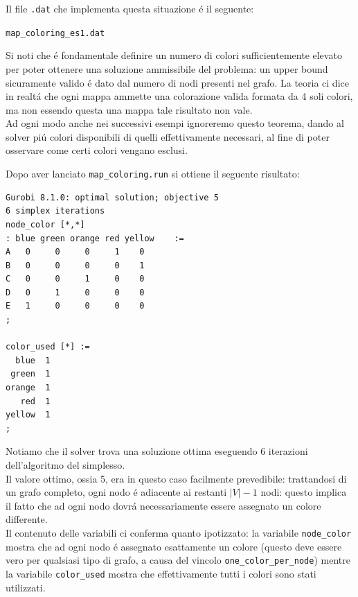 \documentclass{article}
\begin{document}
Il file \texttt{.dat} che implementa questa situazione \'e il seguente:

\vspace{5mm}
\texttt{map\_coloring\_es1.dat}

\vspace{5mm}

Si noti che \'e fondamentale definire un numero di colori sufficientemente elevato per poter ottenere una soluzione ammissibile del problema: un upper bound sicuramente valido \'e dato dal numero di nodi presenti nel grafo. La teoria ci dice in realt\'a che ogni mappa ammette una colorazione valida formata da 4 soli colori, ma non essendo questa una mappa tale risultato non vale.\\
Ad ogni modo anche nei successivi esempi ignoreremo questo teorema, dando al solver pi\'u colori disponibili di quelli effettivamente necessari, al fine di poter osservare come certi colori vengano esclusi.\\

\pagebreak

Dopo aver lanciato \texttt{map\_coloring.run} si ottiene il seguente risultato:\\

\begin{verbatim}
Gurobi 8.1.0: optimal solution; objective 5
6 simplex iterations
node_color [*,*]
: blue green orange red yellow    :=
A   0     0     0     1    0
B   0     0     0     0    1
C   0     0     1     0    0
D   0     1     0     0    0
E   1     0     0     0    0
;

color_used [*] :=
  blue  1
 green  1
orange  1
   red  1
yellow  1
;
\end{verbatim}

Notiamo che il solver trova una soluzione ottima eseguendo 6 iterazioni dell'algoritmo del simplesso.\\
Il valore ottimo, ossia 5, era in questo caso facilmente prevedibile: trattandosi di un grafo completo, ogni nodo \'e adiacente ai restanti $|V| - 1$ nodi: questo implica il fatto che ad ogni nodo dovr\'a necessariamente essere assegnato un colore differente.\\
Il contenuto delle variabili ci conferma quanto ipotizzato: la variabile \texttt{node\_color} mostra che ad ogni nodo \'e assegnato esattamente un colore (questo deve essere vero per qualsiasi tipo di grafo, a causa del vincolo \texttt{one\_color\_per\_node}) mentre la variabile \texttt{color\_used} mostra che effettivamente tutti i colori sono stati utilizzati.\\
\end{document}
